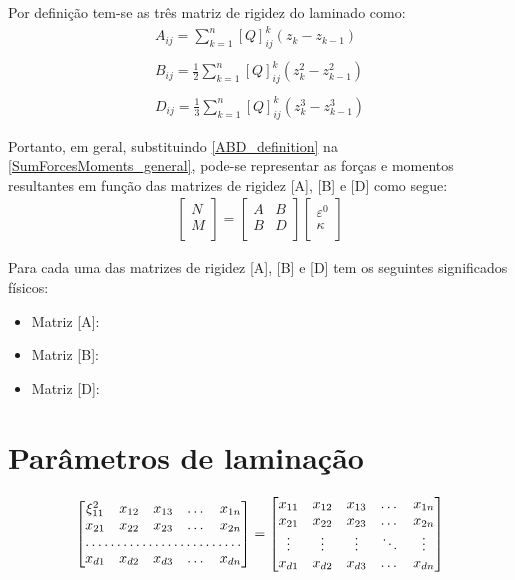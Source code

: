 Por definição tem-se as três matriz de rigidez do laminado como:
\begin{equation} \label{ABD_definition}
\begin{gathered}
A_{ij} = \sum^n_{k=1}[Q]^k_{ij}({z_k} -{z_{k-1}})\\~\\
B_{ij} =\frac{1}{2}\sum^n_{k=1}[Q]^k_{ij}({z^2_k} -{z^2_{k-1}})\\~\\
D_{ij} = \frac{1}{3}\sum^n_{k=1}[Q]^k_{ij}({z^3_k} -{z^3_{k-1}})
\end{gathered}
\end{equation}

Portanto, em geral, substituindo \autoref{ABD_definition} na \autoref{SumForcesMoments_general}, pode-se representar as forças e momentos resultantes em função das matrizes de rigidez [A], [B] e [D] como segue:
\begin{equation} \label{ABD_definition}
\begin{gathered}
\begin{bmatrix}
    N \\
    M \\
\end{bmatrix}
=
\begin{bmatrix}
		A & B \\
		B & D \\
\end{bmatrix}
\begin{bmatrix}
    \varepsilon^0 \\
    \kappa \\
\end{bmatrix}
\end{gathered}
\end{equation}

Para cada uma das matrizes de rigidez [A], [B] e [D] tem os seguintes significados físicos:
\begin{itemize}
\item Matriz [A]:
\item Matriz [B]:
\item Matriz [D]:
\end{itemize}

\section{Parâmetros de laminação}
\[
\begin{bmatrix}
    \xi_{11}^2       & x_{12} & x_{13} & \dots & x_{1n} \\
    x_{21}       & x_{22} & x_{23} & \dots & x_{2n} \\
    \hdotsfor{5} \\
    x_{d1}       & x_{d2} & x_{d3} & \dots & x_{dn}
\end{bmatrix}
=
\begin{bmatrix}
    x_{11} & x_{12} & x_{13} & \dots  & x_{1n} \\
    x_{21} & x_{22} & x_{23} & \dots  & x_{2n} \\
    \vdots & \vdots & \vdots & \ddots & \vdots \\
    x_{d1} & x_{d2} & x_{d3} & \dots  & x_{dn}
\end{bmatrix}
\]

